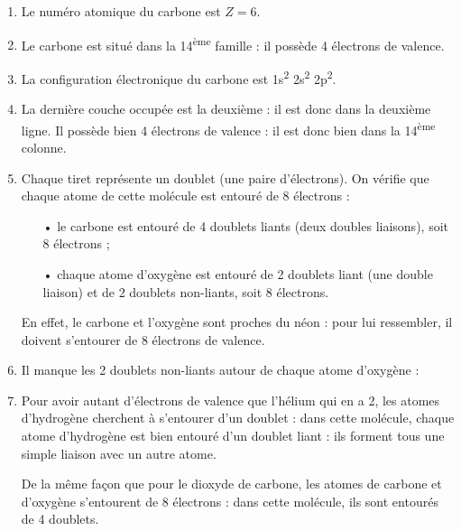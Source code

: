 \documentclass[12pt,a4paper,fleqn]{article}
\begin{document}
\begin{enumerate}[resume]
\item Le numéro atomique du carbone est $Z=6$.

\item Le carbone est situé dans la 14\textsuperscript{ème} famille : il possède 4 électrons de valence.

\item La configuration électronique du carbone est 1s\textsuperscript{2} 2s\textsuperscript{2} 2p\textsuperscript{2}.

\item La dernière couche occupée est la deuxième : il est donc dans la deuxième ligne.
Il possède bien 4 électrons de valence : il est donc bien dans la 14\textsuperscript{ème} colonne.

\item Chaque tiret représente un doublet (une paire d'électrons).
On vérifie que chaque atome de cette molécule est entouré de 8 électrons :
\begin{itemize}
\item[•] le carbone est entouré de 4 doublets liants (deux doubles liaisons), soit 8 électrons ;
\item[•] chaque atome d'oxygène est entouré de 2 doublets liant (une double liaison) et de 2 doublets non-liants, soit 8 électrons.
\end{itemize}
En effet, le carbone et l'oxygène sont proches du néon : pour lui ressembler, il doivent s'entourer de 8 électrons de valence.

\item Il manque les 2 doublets non-liants autour de chaque atome d'oxygène :
\begin{center}
\end{center}

\item Pour avoir autant d'électrons de valence que l'hélium qui en a 2, les atomes d'hydrogène cherchent à s'entourer d'un doublet : dans cette molécule, chaque atome d'hydrogène est bien entouré d'un doublet liant : ils forment tous une simple liaison avec un autre atome.

De la même façon que pour le dioxyde de carbone, les atomes de carbone et d'oxygène s'entourent de 8 électrons : dans cette molécule, ils sont entourés de 4 doublets.
\end{enumerate}
\end{document}
